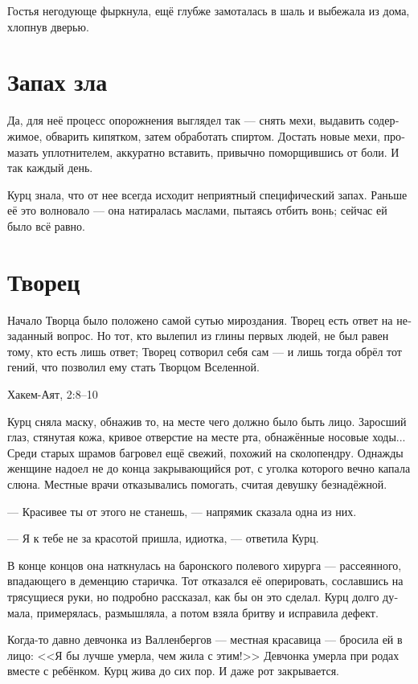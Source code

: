 \documentclass[a4paper,12pt,fleqn]{book}\usepackage{polyglossia}\setdefaultlanguage[babelshorthands=true]{russian}\setotherlanguage{english}\defaultfontfeatures{Ligatures=TeX,Mapping=tex-text}\usepackage{xcolor}\newcommand{\ml}[3]{#2}
\begin{document}
Гостья негодующе фыркнула, ещё глубже замоталась в шаль и выбежала из дома, хлопнув дверью.

\section{Запах зла}

Да, для неё процесс опорожнения выглядел так --- снять мехи, выдавить содержимое, обварить кипятком, затем обработать спиртом.
Достать новые мехи, промазать уплотнителем, аккуратно вставить, привычно поморщившись от боли.
И так каждый день.

Курц знала, что от нее всегда исходит неприятный специфический запах.
Раньше её это волновало --- она натиралась маслами, пытаясь отбить вонь;
сейчас ей было всё равно.

\section{Творец}

\epigraph{Начало Творца было положено самой сутью мироздания.
Творец есть ответ на незаданный вопрос.
Но тот, кто вылепил из глины первых людей, не был равен тому, кто есть лишь ответ;
Творец сотворил себя сам --- и лишь тогда обрёл тот гений, что позволил ему стать Творцом Вселенной.}
{Хакем-Аят, 2:8--10}

Курц сняла маску, обнажив то, на месте чего должно было быть лицо.
Заросший глаз, стянутая кожа, кривое отверстие на месте рта, обнажённые носовые ходы...
Среди старых шрамов багровел ещё свежий, похожий на сколопендру.
Однажды женщине надоел не до конца закрывающийся рот, с уголка которого вечно капала слюна.
Местные врачи отказывались помогать, считая девушку безнадёжной.

--- Красивее ты от этого не станешь, --- напрямик сказала одна из них.

--- Я к тебе не за красотой пришла, идиотка, --- ответила Курц.

В конце концов она наткнулась на баронского полевого хирурга --- рассеянного, впадающего в деменцию старичка.
Тот отказался её оперировать, сославшись на трясущиеся руки, но подробно рассказал, как бы он это сделал.
Курц долго думала, примерялась, размышляла, а потом взяла бритву и исправила дефект.

Когда-то давно девчонка из Валленбергов --- местная красавица --- бросила ей в лицо:
<<Я бы лучше умерла, чем жила с этим!>>
Девчонка умерла при родах вместе с ребёнком.
Курц жива до сих пор.
И даже рот закрывается.
\end{document}
